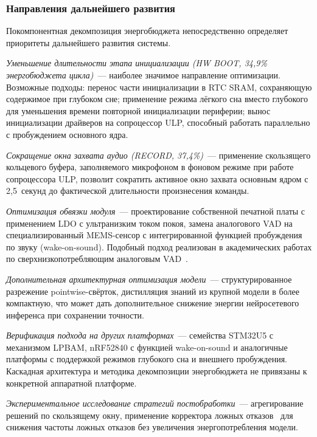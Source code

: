 \subsubsection{Направления дальнейшего развития}

Покомпонентная декомпозиция энергобюджета непосредственно
определяет приоритеты дальнейшего развития системы.

\textit{Уменьшение длительности этапа инициализации (HW BOOT,
	34,9\% энергобюджета цикла)}~--- наиболее значимое направление
оптимизации. Возможные подходы: перенос части инициализации в
RTC SRAM, сохраняющую содержимое при глубоком сне; применение
режима лёгкого сна вместо глубокого для уменьшения времени
повторной инициализации периферии; вынос инициализации
драйверов на сопроцессор ULP, способный работать параллельно
с пробуждением основного ядра.

\textit{Сокращение окна захвата аудио (RECORD, 37,4\%)}~---
применение скользящего кольцевого буфера, заполняемого
микрофоном в фоновом режиме при работе сопроцессора ULP,
позволит сократить активное окно захвата основным ядром с
2,5~секунд до фактической длительности произнесения команды.

\textit{Оптимизация обвязки модуля}~--- проектирование
собственной печатной платы с применением LDO с ультранизким
током покоя, замена аналогового VAD на специализированный
MEMS-сенсор с интегрированной функцией пробуждения по звуку
(wake-on-sound). Подобный подход реализован в академических
работах по сверхнизкопотребляющим аналоговым VAD~\cite{src:29,
	src:30}.

\textit{Дополнительная архитектурная оптимизация модели}~---
структурированное разрежение pointwise-свёрток, дистилляция
знаний из крупной модели в более компактную, что может дать
дополнительное снижение энергии нейросетевого инференса при
сохранении точности.

\textit{Верификация подхода на других платформах}~--- семейства
STM32U5 с механизмом LPBAM, nRF52840 с функцией wake-on-sound и
аналогичные платформы с поддержкой режимов глубокого сна и
внешнего пробуждения. Каскадная архитектура и методика
декомпозиции энергобюджета не привязаны к конкретной аппаратной
платформе.

\textit{Экспериментальное исследование стратегий
	постобработки}~--- агрегирование решений по скользящему окну,
применение корректора ложных отказов~\cite{src:28} для снижения
частоты ложных отказов без увеличения энергопотребления
модели.

